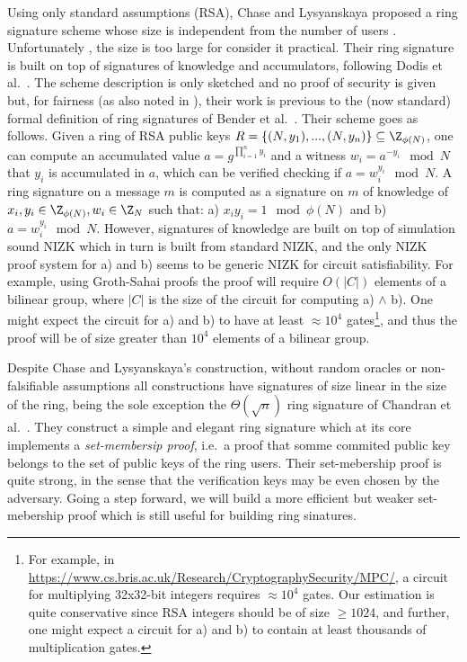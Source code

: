 Using only standard assumptions (RSA), Chase and Lysyanskaya proposed a ring signature scheme whose size is independent from the number of users \cite{C:ChaLys06}. Unfortunately , the size is too large for consider it practical.
Their ring signature is built on top of
signatures of knowledge and accumulators, following Dodis et al.~\cite{EC:DKNS04}. The scheme description is only sketched and no proof of security is given but, for fairness (as also noted in \cite{AC:MalSch17}), their work is previous to the (now standard) formal definition of ring signatures of Bender et al.~\cite{TCC:BenKatMor06}. Their scheme goes as follows.
Given a ring of RSA public keys $R = \{(N,y_1),...,(N,y_n)\}\subseteq \Z_{\phi(N)}$, one can compute an accumulated value $a = g^{\prod_{i=1}^n y_i}$ and a witness $w_i = a^{-y_i} \mod N$ that $y_i$ is accumulated in $a$, which can be verified checking if $a = w_i^{y_i} \mod N$. A ring signature on a message $m$ is computed as a signature on $m$ of knowledge of $x_i,y_i\in \Z_{\phi(N)}, w_i\in \Z_N$ such that: a) $x_iy_i = 1 \mod \phi(N)$ and b)  $a = w_i^{y_i} \mod N$. However, signatures of knowledge are built on top of simulation sound NIZK which in turn is built from standard NIZK, and the only NIZK proof system for a) and b) seems to be generic NIZK for circuit satisfiability. For example, using Groth-Sahai proofs the proof will require $O(|C|)$ elements of a bilinear group, where $|C|$ is the size of the circuit for computing a) $\wedge$ b). One might expect the circuit for a) and b) to have at least $\approx 10^4$ gates\footnote{For example, in \url{https://www.cs.bris.ac.uk/Research/CryptographySecurity/MPC/}, a circuit for multiplying 32x32-bit integers requires $\approx 10^4$ gates. Our estimation is quite conservative since RSA integers should be of size $\geq 1024$, and further, one might expect a circuit for a) and b) to contain at least thousands of multiplication gates.}, and thus the proof will be of size greater than $10^4$ elements of a bilinear group. %

Despite Chase and Lysyanskaya's construction, without random oracles or non-falsifiable assumptions all constructions have signatures of size linear in the size of the ring, being the sole exception the $\Theta(\sqrt{n})$ ring signature of Chandran et al.~\cite{ICALP:ChaGroSah07}. They construct a simple and elegant ring signature which at its core implements a \emph{set-membersip proof}, i.e.~a proof that somme commited public key belongs to the set of public keys of the ring users. Their set-mebership proof is quite strong, in the sense that the verification keys may be even chosen by the adversary. Going a step forward, we will build a more efficient but weaker set-mebership proof which is still useful for building ring sinatures.


